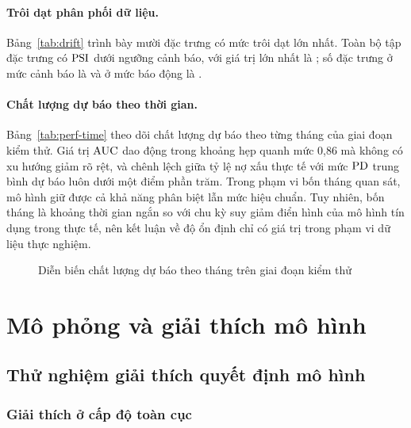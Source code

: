 

\paragraph{Trôi dạt phân phối dữ liệu.} Bảng~\ref{tab:drift} trình bày mười đặc
trưng có mức trôi dạt lớn nhất. Toàn bộ tập đặc trưng có $\mathrm{PSI}$ dưới ngưỡng cảnh
báo, với giá trị lớn nhất là \MaxPSI{}; số đặc trưng ở mức cảnh báo là
\NPSIWarn{} và ở mức báo động là \NPSIAlert{}.



\paragraph{Chất lượng dự báo theo thời gian.} Bảng~\ref{tab:perf-time} theo dõi
chất lượng dự báo theo từng tháng của giai đoạn kiểm thử. Giá trị $\mathrm{AUC}$ dao động
trong khoảng hẹp quanh mức 0,86 mà không có xu hướng giảm rõ rệt, và chênh lệch
giữa tỷ lệ nợ xấu thực tế với mức $\mathrm{PD}$ trung bình dự báo luôn dưới một điểm phần
trăm. Trong phạm vi bốn tháng quan sát, mô hình giữ được cả khả năng phân biệt
lẫn mức hiệu chuẩn. Tuy nhiên, bốn tháng là khoảng thời gian ngắn so với chu kỳ
suy giảm điển hình của mô hình tín dụng trong thực tế, nên kết luận về độ ổn định
chỉ có giá trị trong phạm vi dữ liệu thực nghiệm.



\begin{figure}[!htbp]
\centering
{}
\caption{Diễn biến chất lượng dự báo theo tháng trên giai đoạn kiểm thử}
\label{fig:perf-time}
\end{figure}

\section{Mô phỏng và giải thích mô hình}
\label{sec:mo-phong-he-thong}

\subsection{Thử nghiệm giải thích quyết định mô hình}
\label{subsec:kq-giai-thich}

\subsubsection{Giải thích ở cấp độ toàn cục}

